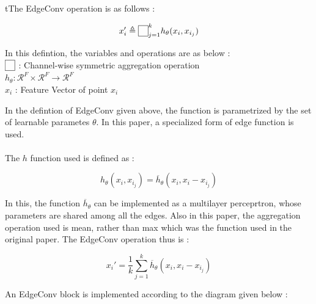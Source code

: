 \begin{definition}
    tThe EdgeConv operation is as follows :

    \begin{equation*}
        x_i' \triangleq \fbox{$\phantom{5}$}_{j=1}^k h_\theta(x_i,x_{i_j})
    \end{equation*}

    \noindent In this defintion, the variables and operations are as below :\\
    $\fbox{$\phantom{5}$}$ : Channel-wise symmetric aggregation operation\\
    $h_\theta : \mathcal{R}^F \times \mathcal{R}^F \rightarrow \mathcal{R}^F$\\
    $x_i$ : Feature Vector of point $x_i$
\end{definition}

\noindent In the defintion of EdgeConv given above, the function is 
parametrized by the set of learnable parametes $\theta$. In this paper, a 
specialized form of edge function is used.
\\\\
The $h$ function used is defined as :

\begin{equation*}
    h_\theta(x_i,x_{i_j}) = \overline{h}_\theta(x_i,x_i - x_{i_j})
\end{equation*}

\noindent In this, the function $\overline{h}_\theta$ can be implemented as a 
multilayer perceprtron, whose parameters are shared among all the edges. Also 
in this paper, the aggregation operation used is mean, rather than max which 
was the function used in the original paper. The EdgeConv operation thus is :

\begin{equation*}
    x_i' = \frac{1}{k} \sum_{j=1}^k \overline{h}_\theta(x_i,x_i - x_{i_j})
\end{equation*}

\noindent An EdgeConv block is implemented according to the diagram given below :

